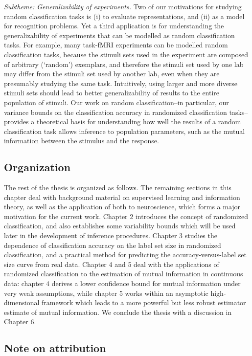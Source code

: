 \emph{Subtheme: Generalizability of experiments.} Two of our
motivations for studying random classification tasks is (i) to
evaluate representations, and (ii) as a model for recognition
problems.  Yet a third application is for understanding the
generalizability of experiments that can be modelled as random
classification tasks.  For example, many task-fMRI experiments can be
modelled random classification tasks, because the stimuli sets used in
the experiment are composed of arbitrary (`random') exemplars, and
therefore the stimuli set used by one lab may differ from the stimuli
set used by another lab, even when they are presumably studying the
same task.  Intuitively, using larger and more diverse stimuli sets
should lead to better generalizability of results to the entire
population of stimuli.  Our work on random classification--in
particular, our variance bounds on the classification accuracy in
randomized classification tasks--provides a theoretical basis for
understanding how well the results of a random classification task
allows inference to population parameters, such as the mutual
information between the stimulus and the response.

\subsection{Organization}

The rest of the thesis is organized as follows.  The remaining
sections in this chapter deal with background material on supervised
learning and information theory, as well as the application of both to
neuroscience, which forms a major motivation for the current work.
Chapter 2 introduces the concept of randomized classification, and
also establishes some variability bounds which will be used later in
the development of inference procedures.  Chapter 3 studies the
dependence of classification accuracy on the label set size in
randomized classification, and a practical method for predicting the
accuracy-versus-label set size curve from real data.  Chapter 4 and 5
deal with the applications of randomized classification to the
estimation of mutual information in continuous data: chapter 4 derives
a lower confidence bound for mutual information under very weak
assumptions, while chapter 5 works within an asymptotic
high-dimensional framework which leads to a more powerful but less
robust estimator estimate of mutual information.  We conclude the
thesis with a discussion in Chapter 6.


\subsection{Note on attribution}

